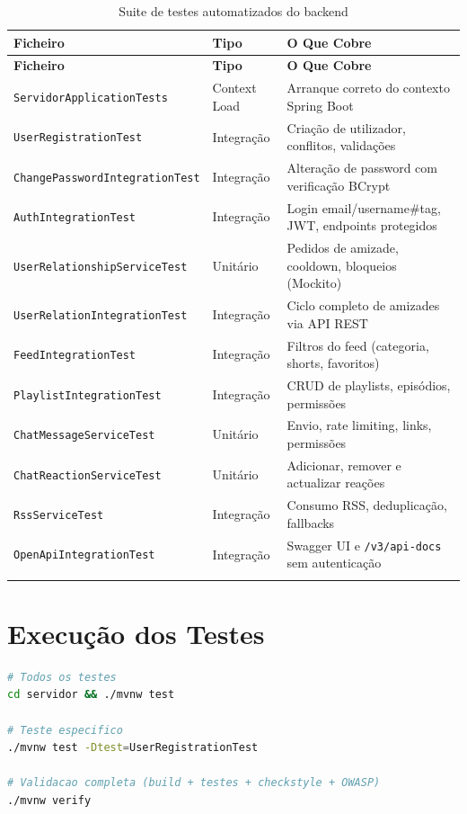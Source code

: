\documentclass[12pt, a4paper]{report}
\begin{document}
\begin{longtable}{L{5.5cm} L{2.5cm} L{5.5cm}}
  \toprule
  \textbf{Ficheiro} & \textbf{Tipo} & \textbf{O Que Cobre} \\
  \midrule
  \endfirsthead
  \toprule
  \textbf{Ficheiro} & \textbf{Tipo} & \textbf{O Que Cobre} \\
  \midrule
  \endhead
  \texttt{ServidorApplicationTests}       & Context Load  & Arranque correto do contexto Spring Boot \\
  \texttt{UserRegistrationTest}           & Integração    & Criação de utilizador, conflitos, validações \\
  \texttt{ChangePasswordIntegrationTest}  & Integração    & Alteração de password com verificação BCrypt \\
  \texttt{AuthIntegrationTest}            & Integração    & Login email/username\#tag, JWT, endpoints protegidos \\
  \texttt{UserRelationshipServiceTest}    & Unitário      & Pedidos de amizade, cooldown, bloqueios (Mockito) \\
  \texttt{UserRelationIntegrationTest}    & Integração    & Ciclo completo de amizades via API REST \\
  \texttt{FeedIntegrationTest}            & Integração    & Filtros do feed (categoria, shorts, favoritos) \\
  \texttt{PlaylistIntegrationTest}        & Integração    & CRUD de playlists, episódios, permissões \\
  \texttt{ChatMessageServiceTest}         & Unitário      & Envio, rate limiting, links, permissões \\
  \texttt{ChatReactionServiceTest}        & Unitário      & Adicionar, remover e actualizar reações \\
  \texttt{RssServiceTest}                 & Integração    & Consumo RSS, deduplicação, fallbacks \\
  \texttt{OpenApiIntegrationTest}         & Integração    & Swagger UI e \texttt{/v3/api-docs} sem autenticação \\
  \bottomrule
  \caption{Suite de testes automatizados do backend}
\end{longtable}

\section{Execução dos Testes}

\begin{lstlisting}[language=bash, caption={Comandos para executar os testes}]
# Todos os testes
cd servidor && ./mvnw test

# Teste especifico
./mvnw test -Dtest=UserRegistrationTest

# Validacao completa (build + testes + checkstyle + OWASP)
./mvnw verify
\end{lstlisting}
\end{document}
